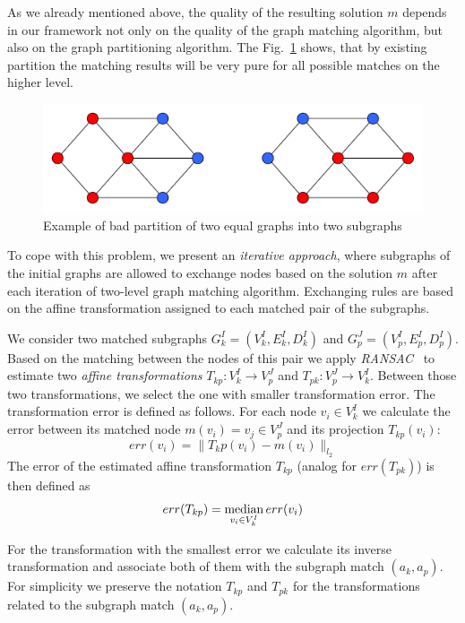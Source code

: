 \documentclass[
	fontsize=12pt,
	paper=a4,
	twoside=false,
	numbers=noenddot,
	plainheadsepline,
	toc=listof,
	toc=bibliography
]{scrartcl}
\def\median{\mathop{\rm median}} 						%
\begin{document}
As we already mentioned above, the quality of the resulting solution $m$ depends in our framework not only on the quality of the graph matching algorithm, but also on the graph partitioning algorithm. The Fig.~\ref{fig:badpartition} shows, that by existing partition the matching results will be very pure for all possible matches on the higher level.

\begin{figure}
	\centering
	\includegraphics[scale=0.35]{fig/badpartition.pdf}
	\caption{Example of bad partition of two equal graphs into two subgraphs} \label{fig:badpartition}
\end{figure}


To cope with this problem, we present an \emph{iterative approach}, where subgraphs of the initial graphs are allowed to exchange nodes based on the solution $m$ after each iteration of two-level graph matching algorithm. Exchanging rules are based on the affine transformation assigned to each matched pair of the subgraphs.

We consider two matched subgraphs $G^I_k=(V^I_k, E^I_k, D^I_k)$ and  $G^J_p=(V^I_p, E^I_p, D^I_p)$. Based on the matching between the nodes of this pair we apply \emph{RANSAC}~\cite{RANSAC} to estimate two \emph{affine transformations} $T_{kp}:V^I_k\rightarrow V^J_p$ and $T_{pk}:V^J_p\rightarrow V^I_k$. Between those two transformations, we select the one with smaller transformation error. The transformation error is defined as follows. For each node $v_i\in V^I_k$ we calculate the error between its matched node $m(v_i) = v_j\in V^J_p$ and its projection $T_{kp}(v_i)$: 
\begin{equation} \label{eq:err_v}
err(v_i) = \|T_kp(v_i) - m(v_i)\|_{l_2}
\end{equation}
The error of the estimated affine transformation $T_{kp}$ (analog for  $err(T_{pk})$) is then defined as
\begin{equation} \label{eq:err_T}
err(T_{kp}) = \median_{v_i\in V^I_k}err(v_i)
\end{equation}

For the transformation with the smallest error we calculate its inverse transformation and associate both of them with the subgraph match $(a_k, a_p)$. For simplicity we preserve the notation $T_{kp}$ and $T_{pk}$ for the transformations related to the subgraph match $(a_k, a_p)$.
\end{document}
